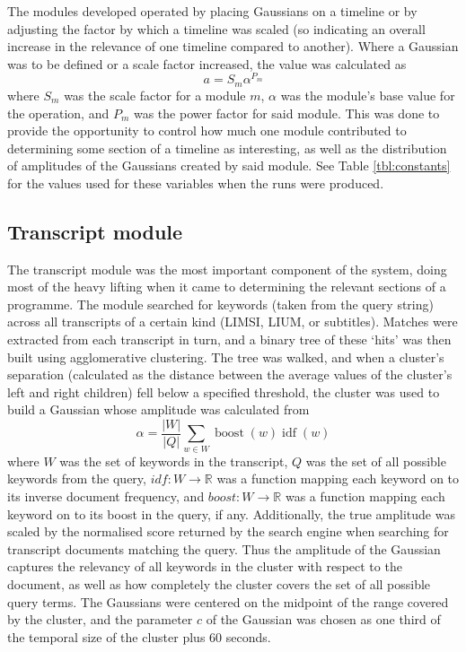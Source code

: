\documentclass{../acm_proc_article-me11_tweaked}
\begin{document}
The modules developed operated by placing Gaussians on a timeline or by 
adjusting the factor by which a timeline was scaled (so indicating an overall 
increase in the relevance of one timeline compared to another). Where a 
Gaussian was to be defined or a scale factor increased, the value was 
calculated as 
\[a = S_m \alpha^{P_m}\]
where \(S_m\) was the scale factor for a module \(m\), \(\alpha\) was the 
module's base value for the operation, and \(P_m\) was the power factor for 
said module. This was done to provide the opportunity to control how much one 
module contributed to determining some section of a timeline as interesting, 
as well as the distribution of amplitudes of the Gaussians created by said 
module. See Table \ref{tbl:constants} for the values used for these variables 
when the runs were produced.

\subsection{Transcript module}
The transcript module was the most important component of the system, doing 
most of the heavy lifting when it came to determining the relevant sections 
of a programme. The module searched for keywords (taken from the query string) 
across all transcripts of a certain kind (LIMSI, LIUM, or subtitles). Matches 
were extracted from each transcript in turn, and a binary tree of these `hits' 
was then built using agglomerative clustering. The tree was walked, and when 
a cluster's separation (calculated as the distance between the average values 
of the cluster's left and right children) fell below a specified threshold, 
the cluster was used to build a Gaussian whose amplitude was calculated from 
\[\alpha = \frac{| W |}{| Q |} \sum_{w \in W} \operatorname{boost}(w) \operatorname{idf}(w)\]
where \(W\) was the set of keywords in the transcript, \(Q\) was the set of 
all possible keywords from the query, \(idf : W \to \mathbb{R}\) was a 
function mapping each keyword on to its inverse document frequency, and 
\(boost : W \to \mathbb{R}\) was a function mapping each keyword on to its 
boost in the query, if any. Additionally, the true amplitude was scaled by the 
normalised score returned by the search engine when searching for transcript 
documents matching the query. Thus the amplitude of the Gaussian captures the 
relevancy of all keywords in the cluster with respect to the document, as well 
as how completely the cluster covers the set of all possible query terms. The 
Gaussians were centered on the midpoint of the range covered by the cluster, 
and the parameter \(c\) of the Gaussian was chosen as one third of the 
temporal size of the cluster plus 60 seconds.
\end{document}
